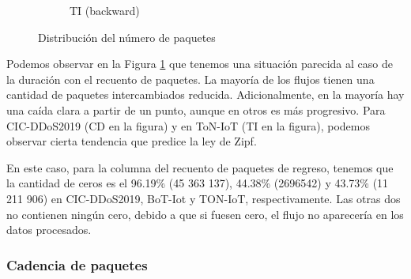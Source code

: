 \begin{figure}[H]
\begin{subfigure}[b]{0.26\textwidth}
        \caption{TI (backward)}
    \end{subfigure}
    \hfill
       \caption{Distribución del número de paquetes}
       \label{fig:packet_pincer_packet_count}
\end{figure}

Podemos observar en la Figura \ref{fig:packet_pincer_packet_count} que tenemos una situación parecida al caso de la duración con el recuento de paquetes. La mayoría de los flujos tienen una cantidad de paquetes intercambiados reducida. Adicionalmente, en la mayoría hay una caída clara a partir de un punto, aunque en otros es más progresivo. Para CIC-DDoS2019 (CD en la figura) y en ToN-IoT (TI en la figura), podemos observar cierta tendencia que predice la ley de Zipf.

En este caso, para la columna del recuento de paquetes de regreso, tenemos que la cantidad de ceros es el 96.19\% (45 363 137), 44.38\% (2696542) y 43.73\% (11 211 906) en CIC-DDoS2019, BoT-Iot y TON-IoT, respectivamente.  Las otras dos no contienen ningún cero, debido a que si fuesen cero, el flujo no aparecería en los datos procesados.

\subsubsection{Cadencia de paquetes}

